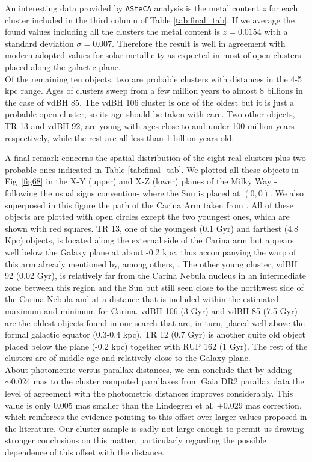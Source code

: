 \documentclass[draft]{aa}
\begin{document}
An interesting data provided by \texttt{ASteCA} analysis is the
metal content $z$ for each cluster included in the third column of Table 
\ref{tab:final_tab}. If we average the found values including all the clusters
the metal content is $z=0.0154$ with a standard deviation $\sigma=0.007$.
Therefore the result is well in agreement with modern adopted values for solar
metallicity as expected in most of open clusters placed along the galactic
plane.\\

Of the remaining ten objects, two are probable clusters with distances in the
4-5 kpc range. Ages of clusters sweep from a few million years
to almost 8 billions in the case of vdBH 85. The vdBH 106 cluster is one of the
oldest but it is just a probable open cluster, so its age should be taken with
care. Two other objects, TR 13 and vdBH 92, are young with ages close to and
under 100 million years respectively, while the rest are all less than 1
billion years old.

A final remark concerns the spatial distribution of the
eight real clusters plus two probable ones indicated in Table 
\ref{tab:final_tab}. We plotted all these objects in Fig~\ref{fig68} in the X-Y
(upper) and X-Z (lower) planes of the Milky Way -following the usual signs
convention- where the Sun is placed at $(0, 0)$. We also superposed in this
figure the path of the Carina Arm taken from \cite{valle_2005}. All of
these objects are plotted with open circles except the two youngest ones,
which are shown with red squares. TR 13, one of the youngest (0.1 Gyr)
and farthest (4.8 Kpc) objects, is located along the external side of the
Carina arm but appears well below the Galaxy plane at about -0.2 kpc, thus
accompanying the warp of this arm already mentioned by, among others,
\cite{Cersosimo_2009}. 
The other young cluster, vdBH 92 (0.02 Gyr), is relatively far from the Carina
Nebula nucleus in an intermediate zone between this region and the Sun but
still seen close to the northwest side of the Carina Nebula and at a distance
that is included within the estimated maximum and minimum for Carina. vdBH 106 
(3 Gyr) and vdBH 85 (7.5 Gyr) are the oldest objects found in our search that
are, in turn, placed well above the formal galactic equator (0.3-0.4 kpc). TR
12 (0.7 Gyr) is another quite old object placed below the plane (-0.2 kpc)
together with RUP 162 (1 Gyr). The rest of the clusters are of middle age and
relatively close to the Galaxy plane.\\

About photometric versus parallax distances, we can conclude that by adding
$\sim0.024$ mas to the cluster computed parallaxes from Gaia DR2 parallax data
the level of agreement with the photometric distances improves considerably.
This value is only $0.005$ mas smaller than the Lindegren et al. $+0.029$ mas
correction, which reinforces the evidence pointing to this offset over larger
values proposed in the literature. Our cluster sample is sadly not large enough
to permit us drawing stronger conclusions on this matter, particularly
regarding the possible dependence of this offset with the distance.
\end{document}
